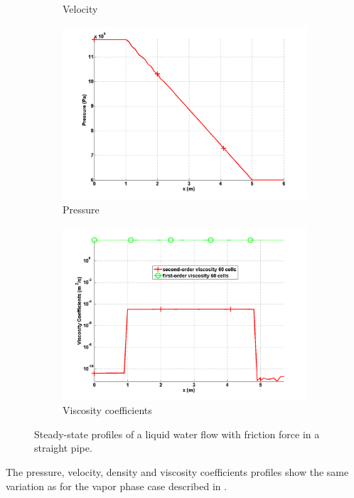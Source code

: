 \begin{figure}[H]
\begin{subfigure}[b]{0.495\textwidth}
                \caption{Velocity}
                \label{fig:1d-liquid-friction-velocity-sct3}
        \end{subfigure}

        \begin{subfigure}[b]{0.495\textwidth}
                \centering
                \includegraphics[width=\textwidth]{figures/liquid_friction_pressure_source_terms.png}
                \caption{Pressure}
                \label{fig:1d-liquid-friction-pressure-sct3}
        \end{subfigure}
        \begin{subfigure}[b]{0.495\textwidth}
                \centering
                \includegraphics[width=\textwidth]{figures/liquid_friction_viscosity_source_terms.png}
                \caption{Viscosity coefficients}
                \label{fig:1d-liquid-friction-visc-sct3}
        \end{subfigure}
        \caption{Steady-state profiles of a liquid water flow with friction force in a straight pipe.}
				\label{fig:1d-liquid-friction-sct3}
\end{figure}
%
The pressure, velocity, density and viscosity coefficients profiles show the same variation as for the vapor phase case described in .
